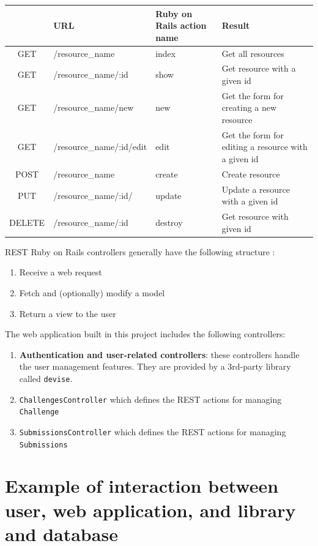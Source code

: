 \begin{tabularx}{\textwidth}{|c|Y|X|X|}
    \hline
    & \textbf{URL} & \textbf{Ruby on Rails action name} & \textbf{Result} \\\hline
    \endhead
    GET & /resource\_name & index & Get all resources \\\hline
    GET & /resource\_name/:id & show & Get resource with a given id \\\hline
    GET & /resource\_name/new & new & Get the form for creating a new resource \\\hline
    GET & /resource\_name/:id/edit & edit & Get the form for editing a resource with a given id \\\hline
    POST & /resource\_name & create & Create resource \\\hline
    PUT & /resource\_name/:id/ & update & Update a resource with a given id \\\hline
    DELETE & /resource\_name/:id & destroy & Get resource with given id \\\hline
\end{tabularx}

REST Ruby on Rails controllers generally have the following structure \citep{RoRDocumentation}:
\begin{enumerate}
    \item Receive a web request
    \item Fetch and (optionally) modify a model
    \item Return a view to the user
\end{enumerate}

The web application built in this project includes the following controllers:
\begin{enumerate}
    \item \textbf{Authentication and user-related controllers}: these controllers handle the user management features. They are provided by a 3rd-party library called \texttt{devise}.
    \item \texttt{ChallengesController} which defines the REST actions for managing \texttt{Challenge}
    \item \texttt{SubmissionsController} which defines the REST actions for managing \texttt{Submissions}

\end{enumerate}

\section{Example of interaction between user, web application, and library and database}

